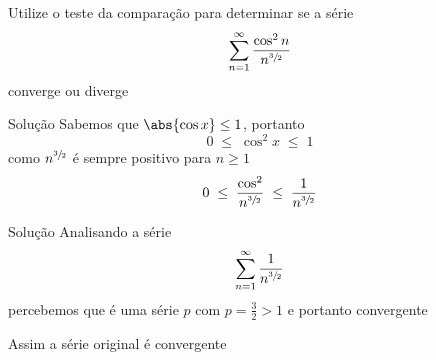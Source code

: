 \begin{question}
  Utilize o teste da comparação para determinar se a série
  \[
    \sum_{n=1}^{\infty} \frac{\cos^2 n}{n^{\sfrac{3}{2}}}
  \]
  converge ou diverge
\end{question}

\begin{resolution}{Solução}
  Sabemos que \(\abs{\cos x}\leq 1\)\pause,
  portanto
  \[
    0 \;\leq\;\cos^2 x \;\leq\; 1
  \]
  \pause
  como $n^{\sfrac{3}{2}}$ é sempre positivo para $n\geq 1$
  \[
    0 \;\leq\; \frac{\cos^2}{n^{\sfrac{3}{2}}} \;\leq\; \frac{1}{n^{\sfrac{3}{2}}}
  \]
\end{resolution}

\begin{resolution}{Solução}
  Analisando a série
  \[
    \sum_{n=1}^{\infty} \frac{1}{n^{\sfrac{3}{2}}}
  \]
  percebemos que é uma série $p$ com $p=\frac{3}{2}>1$ e portanto convergente

  \pause
  \vspace{1.5\baselineskip}
  Assim a série original é convergente
\end{resolution}

